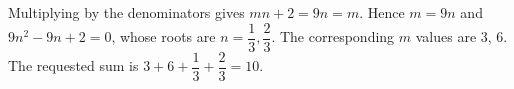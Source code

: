 Multiplying by the denominators gives $mn+2=9n=m$. Hence $m=9n$ and $9n^2-9n+2=0$, whose roots are $n=\dfrac{1}{3},\dfrac{2}{3}$. The corresponding $m$ values are 3, 6. The requested sum is $3+6+\dfrac{1}{3}+\dfrac{2}{3}=\boxed{10}$.
